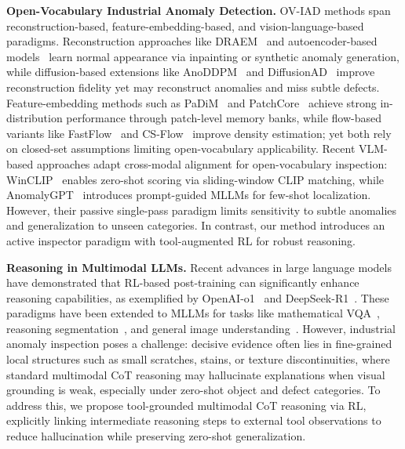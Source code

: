 \documentclass{article}
\begin{document}
\textbf{Open-Vocabulary Industrial Anomaly Detection.}
OV-IAD methods span reconstruction-based, feature-embedding-based, and vision-language-based paradigms. Reconstruction approaches like DRAEM~\citep{zavrtanik2021draem} and autoencoder-based models~\citep{bergmann2018improving} learn normal appearance via inpainting or synthetic anomaly generation, while diffusion-based extensions like AnoDDPM~\citep{wyatt2022anoddpm} and DiffusionAD~\citep{mu2023diffusionad} improve reconstruction fidelity yet may reconstruct anomalies and miss subtle defects. Feature-embedding methods such as PaDiM~\citep{defard2021padim} and PatchCore~\citep{roth2022patchcore} achieve strong in-distribution performance through patch-level memory banks, while flow-based variants like FastFlow~\citep{yu2021fastflow} and CS-Flow~\citep{rudolph2022csflow} improve density estimation; yet both rely on closed-set assumptions limiting open-vocabulary applicability. Recent VLM-based approaches adapt cross-modal alignment for open-vocabulary inspection: WinCLIP~\citep{jeong2023winclip} enables zero-shot scoring via sliding-window CLIP matching, while AnomalyGPT~\citep{gu2024anomalygpt} introduces prompt-guided MLLMs for few-shot localization. However, their passive single-pass paradigm limits sensitivity to subtle anomalies and generalization to unseen categories. In contrast, our method introduces an active inspector paradigm with tool-augmented RL for robust reasoning.

\textbf{Reasoning in Multimodal LLMs.}
Recent advances in large language models have demonstrated that RL-based post-training can significantly enhance reasoning capabilities, as exemplified by OpenAI-o1~\citep{jaech2024openaio1} and DeepSeek-R1~\citep{deepseekr1}. These paradigms have been extended to MLLMs for tasks like mathematical VQA~\citep{peng2025lmmr1}, reasoning segmentation~\citep{liu2025seg}, and general image understanding~\citep{feng2025videor1}. However, industrial anomaly inspection poses a challenge: decisive evidence often lies in fine-grained local structures such as small scratches, stains, or texture discontinuities, where standard multimodal CoT reasoning may hallucinate explanations when visual grounding is weak, especially under zero-shot object and defect categories. To address this, we propose tool-grounded multimodal CoT reasoning via RL, explicitly linking intermediate reasoning steps to external tool observations to reduce hallucination while preserving zero-shot generalization.
\end{document}

